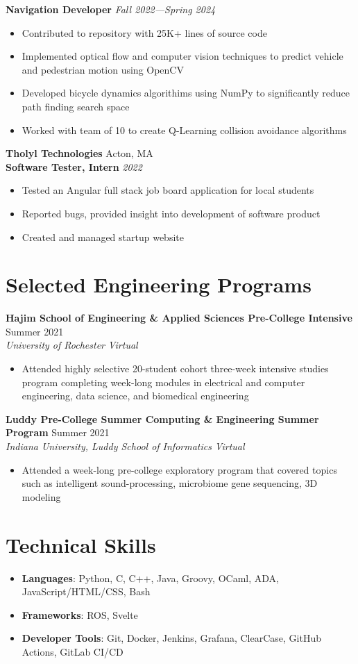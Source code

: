 \documentclass[letterpaper,10pt]{article}
\newcommand{\company}[2]{
    \vspace{6pt}
    {\large \textbf{#1}}
    \hfill
    {\normalsize {#2}}
    \\
}
\newcommand{\position}[2]{
    \vspace{4pt}
    {\normalsize \textbf {#1}}
    \hfill
    {\normalsize \textit{#2}}
    \\
}
\newcommand{\resumeEntry}[4]{
    \vspace{4pt}
    {\large \textbf{#1}}
    \hfill
    {\normalsize #2}
    \\
    \textit{#3} \hfill \textit{#4}
    \vspace{1pt}
}
\newcommand{\itemsBegin}{
    \begin{itemize}[leftmargin=0.2in, labelsep=0.05in, itemsep=0pt, parsep=1pt, topsep=0pt, partopsep=0pt]
}
\newcommand{\itemsEnd}{\end{itemize}}
\begin{document}
    \position{Navigation Developer}{Fall 2022---Spring 2024}
    \itemsBegin{}
        \item Contributed to repository with 25K+ lines of source code
        \item Implemented optical flow and computer vision techniques to predict vehicle and pedestrian motion using OpenCV
        \item Developed bicycle dynamics algorithims using NumPy to significantly reduce path finding search space
        \item Worked with team of 10 to create Q-Learning collision avoidance algorithms
    \itemsEnd{}

    \company{Tholyl Technologies}{Acton, MA}

    \position{Software Tester, Intern}{2022}
    \itemsBegin
        \item Tested an Angular full stack job board application for local students
        \item Reported bugs, provided insight into development of software product
        \item Created and managed startup website
    \itemsEnd


\section{Selected Engineering Programs}


    \resumeEntry{Hajim School of Engineering \& Applied Sciences Pre-College Intensive}
        {Summer 2021}
        {University of Rochester}
        {Virtual}

    \itemsBegin{}
        \item Attended highly selective 20-student cohort three-week intensive studies program completing week-long modules in electrical and computer engineering, data science, and biomedical engineering
    \itemsEnd{}

    \resumeEntry{Luddy Pre-College Summer Computing \& Engineering Summer Program}
        {Summer 2021}
        {Indiana University, Luddy School of Informatics}
        {Virtual}

    \itemsBegin{}
        \item Attended a week-long pre-college exploratory program that covered topics such as intelligent sound-processing, microbiome gene sequencing, 3D modeling
    \itemsEnd{}

\section{Technical Skills}

    \itemsBegin{}
        \item \textbf{Languages}{: Python, C, C++, Java, Groovy, OCaml, ADA,  JavaScript/HTML/CSS, Bash}
        \item \textbf{Frameworks}{: ROS, Svelte}
        \item \textbf{Developer Tools}{: Git, Docker, Jenkins, Grafana, ClearCase, GitHub Actions, GitLab CI/CD }
    \itemsEnd{}
\end{document}
